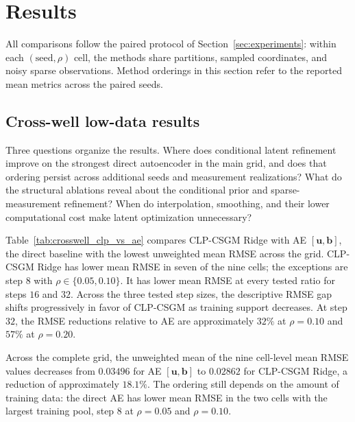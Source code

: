 \section{Results}
\label{sec:results}

All comparisons follow the paired protocol of
Section~\ref{sec:experiments}: within each $(\mathrm{seed},\rho)$ cell, the
methods share partitions, sampled coordinates, and noisy sparse observations.
Method orderings in this section refer to the reported mean metrics across the
paired seeds.

\subsection{Cross-well low-data results}
\label{subsec:crosswell_results}

Three questions organize the results. Where does conditional latent
refinement improve on the strongest direct autoencoder in the main grid, and
does that ordering persist across additional seeds and measurement
realizations? What do the structural ablations reveal about the conditional
prior and sparse-measurement refinement? When do interpolation, smoothing,
and their lower computational cost make latent optimization unnecessary?

Table~\ref{tab:crosswell_clp_vs_ae} compares CLP-CSGM Ridge with AE
$[\boldsymbol{u},\boldsymbol{b}]$, the direct baseline with the lowest
unweighted mean RMSE across the grid. CLP-CSGM Ridge has lower mean RMSE in
seven of the nine cells; the exceptions are step $8$ with
$\rho\in\{0.05,0.10\}$. It has lower mean RMSE at every tested ratio for steps
$16$ and $32$. Across the three tested step sizes, the descriptive RMSE gap
shifts progressively in favor of CLP-CSGM as training support decreases.
At step $32$, the RMSE reductions relative to AE are approximately $32\%$ at
$\rho=0.10$ and $57\%$ at $\rho=0.20$.

Across the complete grid, the unweighted mean of the nine cell-level mean RMSE
values decreases from $0.03496$ for AE
$[\boldsymbol{u},\boldsymbol{b}]$ to $0.02862$ for CLP-CSGM Ridge, a reduction
of approximately $18.1\%$. The ordering still depends on the amount of
training data: the direct AE has lower mean RMSE in the two cells with the
largest training pool, step $8$ at $\rho=0.05$ and $\rho=0.10$.

\begin{table}[!htbp]
    \centering
    \caption{Cross-well $V_c$ comparison between CLP-CSGM Ridge and
    AE $[\boldsymbol{u},\boldsymbol{b}]$. Values are RMSE mean and standard
    deviation across seeds; a negative gap favors CLP-CSGM.}
    \label{tab:crosswell_clp_vs_ae}
    \small
\end{table}

